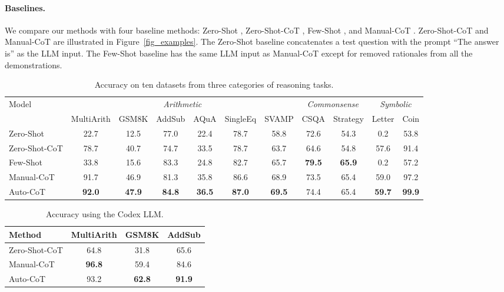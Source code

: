 \paragraph{Baselines.} We compare our methods with four baseline methods: Zero-Shot \citep{kojima2022large}, Zero-Shot-CoT \citep{kojima2022large}, Few-Shot \citep{cot_wei}, and Manual-CoT \citep{cot_wei}. Zero-Shot-CoT and Manual-CoT are illustrated in Figure~\ref{fig_examples}. The Zero-Shot baseline concatenates a test question with the prompt ``The answer is'' as the LLM input. The Few-Shot baseline has the same LLM input as Manual-CoT except for removed rationales from all the demonstrations.

\begin{table}[t]\centering

\setlength{\tabcolsep}{3.6pt}
\caption{Accuracy on ten datasets from three categories of reasoning tasks. 
}
\vspace{2.8mm}
\begin{tabular}{lcccccccccc}\toprule
Model &\multicolumn{6}{c}{\textit{Arithmetic}} &\multicolumn{2}{c}{\textit{Commonsense}} &\multicolumn{2}{c}{\textit{Symbolic}}\\
\cmidrule(r){2-7}
\cmidrule(r){8-9}%
\cmidrule(r){10-11}%
&MultiArith   &GSM8K &AddSub &AQuA &SingleEq &SVAMP &CSQA &Strategy &Letter &Coin  \\\midrule
Zero-Shot  &  22.7 & 12.5  & {77.0}& 22.4 & {78.7}& 58.8 & {72.6} & {54.3} & 0.2 & 53.8\\
Zero-Shot-CoT  & {78.7}  & {40.7}& 74.7& {33.5} & {78.7} & {63.7} & 64.6 & 54.8 & 57.6 & 91.4\\
\midrule
Few-Shot & 33.8  & 15.6 & 83.3 & 24.8 & 82.7 & 65.7 & \textbf{79.5} & \textbf{65.9} & 0.2 & 57.2\\
Manual-CoT   & 91.7 & 46.9& 81.3 & 35.8 & {86.6} & {68.9} & 73.5 & 65.4 & 59.0 & 97.2 \\
\midrule
Auto-CoT & \textbf{92.0}   & \textbf{47.9}   & \textbf{84.8}   & \textbf{36.5}  & \textbf{87.0}  & \textbf{69.5}  &  74.4  &  {65.4} & \textbf{59.7} & \textbf{99.9}  \\

\bottomrule
\end{tabular}
\label{tab:main_results}
\end{table}

\begin{wraptable}{r}{0.48\textwidth}
    \centering
    \caption{Accuracy using the Codex LLM.}\label{exp-codex} 
    \setlength{\tabcolsep}{3pt}
            \begin{tabular}{lccc}
    \toprule
     {Method}& {MultiArith} & {GSM8K}& {AddSub} \\
    \midrule
    Zero-Shot-CoT & 64.8 & 31.8 & 65.6  \\
    Manual-CoT &\textbf{96.8} & 59.4 & 84.6 \\
     \midrule
    Auto-CoT  & {93.2} & \textbf{62.8} & \textbf{91.9} \\
    \bottomrule
  \end{tabular}
\end{wraptable}

